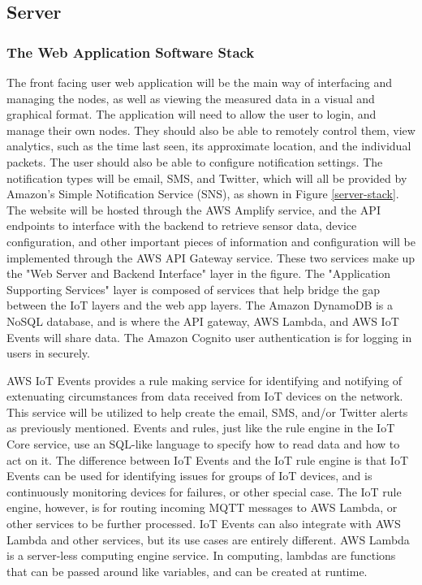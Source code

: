 \subsection{Server}

\subsubsection{The Web Application Software Stack}
The front facing user web application will be the main way of interfacing and managing the nodes, as
well as viewing the measured data in a visual and graphical format. The application will need to
allow the user to login, and manage their own nodes. They should also be able to remotely control
them, view analytics, such as the time last seen, its approximate location, and the individual
packets. The user should also be able to configure notification settings. The notification types
will be email, SMS, and Twitter, which will all be provided by Amazon's Simple Notification Service
(SNS), as shown in Figure \ref{server-stack}. The website will be hosted through the AWS Amplify
service, and the API endpoints to interface with the backend to retrieve sensor data, device
configuration, and other important pieces of information and configuration will be implemented
through the AWS API Gateway service. These two services make up the "Web Server and Backend
Interface" layer in the figure. The "Application Supporting Services" layer is composed of services
that help bridge the gap between the IoT layers and the web app layers. The Amazon DynamoDB is
a NoSQL database, and is where the API gateway, AWS Lambda, and AWS IoT Events will share data. The
Amazon Cognito user authentication is for logging in users in securely. 

AWS IoT Events provides a rule making service for identifying and notifying of extenuating
circumstances from data received from IoT devices on the network. This service will be utilized to
help create the email, SMS, and/or Twitter alerts as previously mentioned. Events and rules, just
like the rule engine in the IoT Core service, use an SQL-like language to specify how to read data
and how to act on it. The difference between IoT Events and the IoT rule engine is that IoT Events
can be used for identifying issues for groups of IoT devices, and is continuously monitoring devices
for failures, or other special case. The IoT rule engine, however, is for routing incoming MQTT
messages to AWS Lambda, or other services to be further processed. IoT Events can also integrate
with AWS Lambda and other services, but its use cases are entirely different. AWS Lambda is
a server-less computing engine service. In computing, lambdas are functions that can be passed
around like variables, and can be created at runtime.

